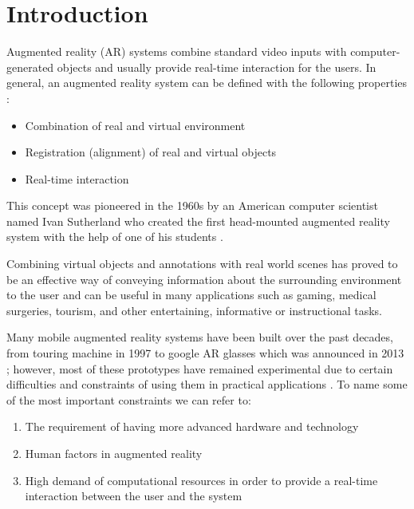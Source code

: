\documentclass[12pt]{report}
\begin{document}
\chapter{Introduction}

Augmented reality (AR) systems combine standard video inputs with computer-generated objects and
usually provide real-time interaction for the users. 
In general, an augmented reality system can be defined with the following properties \cite{azuma01} :
\begin{itemize}
\item Combination of real and virtual environment
\item Registration (alignment) of real and virtual objects
\item Real-time interaction
\end{itemize}
This concept was pioneered in the 1960s by an American computer scientist named Ivan Sutherland
who created the first head-mounted augmented reality
system with the help of one of his students \cite{azuma01}.

Combining virtual objects and annotations with real
world scenes has proved to be an effective way of conveying information about the surrounding environment to
the user and can be useful in many applications such as gaming, medical surgeries, tourism, and other entertaining, informative or instructional tasks.

Many mobile augmented reality systems have been built over the past decades, from touring machine in 1997 \cite{fei97} 
to google AR glasses which was announced in 2013 \cite{google}; however, most of these prototypes have remained experimental
due to certain difficulties and constraints of using them in practical applications \cite{dras96,liv05}. To name some of the most important constraints
we can refer to:
\begin{enumerate}
\item The requirement of having more advanced hardware and technology
\item Human factors in augmented reality 
\item High demand of computational resources in order to provide a real-time interaction between the user and the system
\end{enumerate}
\end{document}
